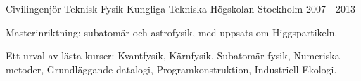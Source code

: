 


\begin{cventries}




\cventry
{Civilingenj{\"o}r Teknisk Fysik} %
{Kungliga Tekniska H{\"o}gskolan} %
{Stockholm} %
{2007 - 2013} %
{ %
\begin{cvitems}
\item {Masterinriktning: subatom{\"a}r och astrofysik, med uppsats om Higgspartikeln.}
\item {Ett urval av l{\"a}sta kurser: Kvantfysik, K{\"a}rnfysik, Subatom{\"a}r fysik, Numeriska metoder, Grundl{\"a}ggande datalogi, Programkonstruktion, Industriell Ekologi.}
\end{cvitems}
}


\end{cventries}
